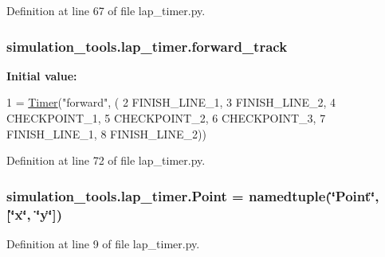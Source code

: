 Definition at line 67 of file lap\+\_\+timer.\+py.

\subsubsection[{\texorpdfstring{forward\+\_\+track}{forward_track}}]{\setlength{\rightskip}{0pt plus 5cm}simulation\+\_\+tools.\+lap\+\_\+timer.\+forward\+\_\+track}\hypertarget{namespacesimulation__tools_1_1lap__timer_aab75b520d524490f7b0bdcf6b28761a6}{}\label{namespacesimulation__tools_1_1lap__timer_aab75b520d524490f7b0bdcf6b28761a6}
{\bfseries Initial value\+:}
\begin{DoxyCode}
1 = \hyperlink{classsimulation__tools_1_1lap__timer_1_1_timer}{Timer}(\textcolor{stringliteral}{"forward"}, (
2     FINISH\_LINE\_1,
3     FINISH\_LINE\_2,
4     CHECKPOINT\_1,
5     CHECKPOINT\_2,
6     CHECKPOINT\_3,
7     FINISH\_LINE\_1,
8     FINISH\_LINE\_2))
\end{DoxyCode}


Definition at line 72 of file lap\+\_\+timer.\+py.

\subsubsection[{\texorpdfstring{Point}{Point}}]{\setlength{\rightskip}{0pt plus 5cm}simulation\+\_\+tools.\+lap\+\_\+timer.\+Point = namedtuple(\char`\"{}Point\char`\"{}, \mbox{[}\char`\"{}x\char`\"{}, \char`\"{}y\char`\"{}\mbox{]})}\hypertarget{namespacesimulation__tools_1_1lap__timer_a55d342023a9bdc266a2ee262040e8d19}{}\label{namespacesimulation__tools_1_1lap__timer_a55d342023a9bdc266a2ee262040e8d19}


Definition at line 9 of file lap\+\_\+timer.\+py.

